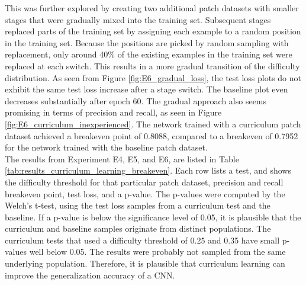 This was further explored by creating two additional patch datasets with smaller stages that were gradually mixed into the training set. Subsequent stages replaced parts of the training set by assigning each example to a random position in the training set. Because the positions are picked by random sampling with replacement, only around 40\% of the existing examples in the training set were replaced at each switch. This results in a more gradual transition of the difficulty distribution. As seen from Figure \ref{fig:E6_gradual_loss}, the test loss plots do not exhibit the same test loss increase after a stage switch. The baseline plot even decreases substantially after epoch 60. The gradual approach also seems promising in terms of precision and recall, as seen in Figure \ref{fig:E6_curriculum_inexperienced}. The network trained with a curriculum patch dataset achieved a breakeven point of 0.8088, compared to a breakeven of 0.7952 for the network trained with the baseline patch dataset.\\



The results from Experiment E4, E5, and E6, are listed in Table \ref{tab:results_curriculum_learning_breakeven}. Each row lists a test, and shows the difficulty threshold for that particular patch dataset, precision and recall breakeven point, test loss, and a p-value. The p-values were computed by the Welch's t-test, using the test loss samples from a curriculum test and the baseline. If a p-value is below the significance level of 0.05, it is plausible that the curriculum and baseline samples originate from distinct populations. The curriculum tests that used a difficulty threshold of 0.25 and 0.35 have small p-values well below 0.05. The results were probably not sampled from the same underlying population. Therefore, it is plausible that curriculum learning can improve the generalization accuracy of a \ac{CNN}. \\


